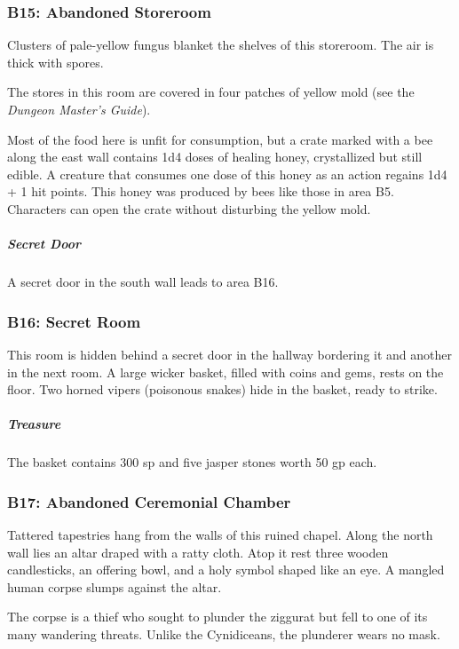 \documentclass[10pt,a4paper,twoside,bg=print,twocolumn,openany,nodeprecatedcode]{dndbook}
\begin{document}
\subsubsection{B15: Abandoned Storeroom}
\begin{DndReadAloud}{}
Clusters of pale-yellow fungus blanket the shelves of this storeroom. The air is thick with spores.

\end{DndReadAloud}

The stores in this room are covered in four patches of yellow mold (see the \textit{Dungeon Master's Guide}).

Most of the food here is unfit for consumption, but a crate marked with a bee along the east wall contains 1d4 doses of healing honey, crystallized but still edible. A creature that consumes one dose of this honey as an action regains 1d4 + 1 hit points. This honey was produced by bees like those in area B5. Characters can open the crate without disturbing the yellow mold.

\subparagraph{Secret Door}
A secret door in the south wall leads to area B16.

\subsubsection{B16: Secret Room}
This room is hidden behind a secret door in the hallway bordering it and another in the next room. A large wicker basket, filled with coins and gems, rests on the floor. Two horned vipers (poisonous snakes) hide in the basket, ready to strike.

\subparagraph{Treasure}
The basket contains 300 sp and five jasper stones worth 50 gp each.

\subsubsection{B17: Abandoned Ceremonial Chamber}
\begin{DndReadAloud}{}
Tattered tapestries hang from the walls of this ruined chapel. Along the north wall lies an altar draped with a ratty cloth. Atop it rest three wooden candlesticks, an offering bowl, and a holy symbol shaped like an eye. A mangled human corpse slumps against the altar.

\end{DndReadAloud}

The corpse is a thief who sought to plunder the ziggurat but fell to one of its many wandering threats. Unlike the Cynidiceans, the plunderer wears no mask.
\end{document}
